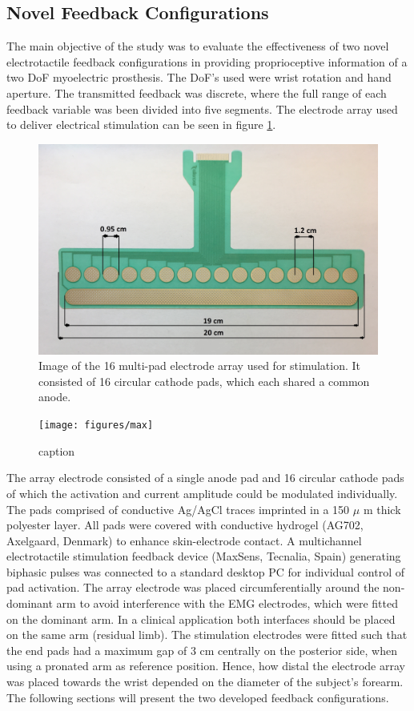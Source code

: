 \subsection{Novel Feedback Configurations}
The main objective of the study was to evaluate the effectiveness of two novel electrotactile feedback configurations in providing proprioceptive information of a two DoF myoelectric prosthesis. 
The DoF's used were wrist rotation and hand aperture. The transmitted feedback was discrete, where the full range of each feedback variable was been divided into five segments. The electrode array used to deliver electrical stimulation can be seen in figure \ref{fig:pa:electrode}.
\begin{figure}[H]                 
	\includegraphics[width=.95\textwidth]{figures/electrode}  
	\caption{Image of the 16 multi-pad electrode array used for stimulation. It consisted of 16 circular cathode pads, which each shared a common anode.}
	\label{fig:pa:electrode} 
\end{figure}
\begin{figure}[h]                 
	\texttt{[image: figures/max]}  
	\caption{caption}
	\label{fig:pa:max} 
\end{figure}   
The array electrode consisted of a single anode pad and 16 circular cathode pads of which the activation and current amplitude could be modulated individually. The pads comprised of conductive Ag/AgCl traces imprinted in a 150 $\mu$ m thick polyester layer. All pads were covered with conductive hydrogel (AG702, Axelgaard, Denmark) to enhance skin-electrode contact.  A multichannel electrotactile stimulation feedback device (MaxSens, Tecnalia, Spain) generating biphasic pulses was connected to a standard desktop PC for individual control of pad activation. The array electrode was placed circumferentially around the non-dominant arm to avoid interference with the EMG electrodes, which were fitted on the dominant arm. In a clinical application both interfaces should be placed on the same arm (residual limb). The stimulation electrodes were fitted such that the end pads had a maximum gap of 3 cm centrally on the posterior side, when using a pronated arm as reference position. Hence, how distal the electrode array was placed towards the wrist depended on the diameter of the subject's forearm. The following sections will present the two developed feedback configurations. 


